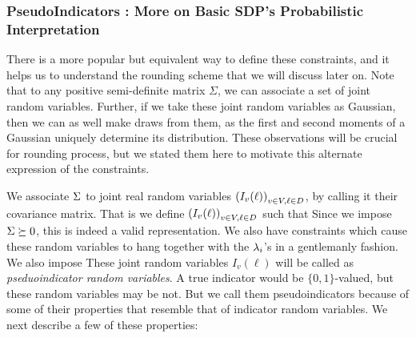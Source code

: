 \subsubsection{PseudoIndicators : More on Basic SDP's Probabilistic Interpretation}
There is a more popular but equivalent way to define these constraints, and it helps us to understand the rounding scheme that we will discuss later on. 
Note that to any positive semi-definite matrix $\Sigma$, we can associate a set of joint random variables. 
Further, if we take these joint random variables as Gaussian, then we can as well make draws from them, as the first and second moments of a Gaussian  uniquely determine its distribution. 
These observations will be crucial for rounding process, but we stated them here to motivate this alternate expression of the constraints. 

We associate $\Sigma$ to joint real random variables $\left(I_v(\ell)\right)_{v\in V, \ell \in D}$, by calling it their covariance matrix. That is we define $\left(I_v(\ell)\right)_{v\in V, \ell \in D}$ such that
Since we impose $\Sigma \succeq 0$, this is indeed a valid representation. 
We also have constraints which cause these random variables to hang together with the $\lambda_{i}$'s in a gentlemanly fashion. We also impose
These joint random variables $I_v(\ell)$ will be called as \textit{pseduoindicator random variables}. A true indicator would be $\{ 0, 1\}$-valued, but these random variables may be not. But we call them pseudoindicators because of some of their properties that resemble that of indicator random variables. We next describe a few of these properties: 

